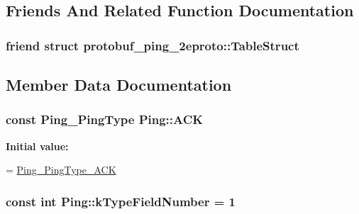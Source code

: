 \subsection{Friends And Related Function Documentation}
\subsubsection[{\texorpdfstring{protobuf\+\_\+ping\+\_\+2eproto\+::\+Table\+Struct}{protobuf_ping_2eproto::TableStruct}}]{\setlength{\rightskip}{0pt plus 5cm}friend struct {\bf protobuf\+\_\+ping\+\_\+2eproto\+::\+Table\+Struct}\hspace{0.3cm}{\ttfamily [friend]}}\hypertarget{class_ping_ac940cc130ab5832d68bbe7604cce8a21}{}\label{class_ping_ac940cc130ab5832d68bbe7604cce8a21}


\subsection{Member Data Documentation}
\subsubsection[{\texorpdfstring{A\+CK}{ACK}}]{\setlength{\rightskip}{0pt plus 5cm}const {\bf Ping\+\_\+\+Ping\+Type} Ping\+::\+A\+CK\hspace{0.3cm}{\ttfamily [static]}}\hypertarget{class_ping_a5b6701609d0a2d04eccffd28ace8f44e}{}\label{class_ping_a5b6701609d0a2d04eccffd28ace8f44e}
{\bfseries Initial value\+:}
\begin{DoxyCode}
=
    \hyperlink{ping_8pb_8h_a4b13f38feb620891e72b30e36aaaf35ba0bc7b688be9b1595e816c742d33b8b0e}{Ping\_PingType\_ACK}
\end{DoxyCode}
\subsubsection[{\texorpdfstring{k\+Type\+Field\+Number}{kTypeFieldNumber}}]{\setlength{\rightskip}{0pt plus 5cm}const int Ping\+::k\+Type\+Field\+Number = 1\hspace{0.3cm}{\ttfamily [static]}}\hypertarget{class_ping_a2ec16d3d988ff75ef9da99ae2bb1ec66}{}\label{class_ping_a2ec16d3d988ff75ef9da99ae2bb1ec66}
